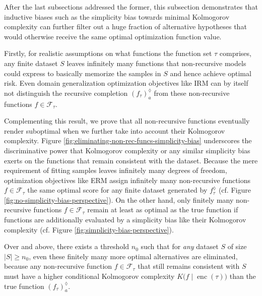 After the last subsections addressed the former, this subsection demonstrates that inductive biases such as the simplicity bias towards minimal Kolmogorov complexity can further filter out a huge fraction of alternative hypotheses that would otherwise receive the same optimal optimization function value.

Firstly, for realistic assumptions on what functions the function set $\tau$ comprises, any finite dataset $S$ leaves infinitely many functions that non-recursive models could express to basically memorize the samples in $S$ and hence achieve optimal risk.
Even domain generalization optimization objectives like IRM can by itself not distinguish the recursive completion $\left(f_{\tau}\right)_a^{\lozenge}$ from these non-recursive functions $f\in \mathcal{F}_{\tau}$.

Complementing this result, we prove that all non-recursive functions eventually render suboptimal when we further take into account their Kolmogorov complexity.
Figure \ref{fig:eliminating-non-rec-funcs-simplicity-bias} underscores the discriminative power that Kolmogorov complexity or any similar simplicity bias exerts on the functions that remain consistent with the dataset.
Because the mere requirement of fitting samples leaves infinitely many degrees of freedom, optimization objectives like ERM assign infinitely many non-recursive functions $f\in\mathcal{F}_{\tau}$ the same optimal score for any finite dataset generated by $f_{\tau}^{\lozenge}$ (cf. Figure \ref{fig:no-simplicity-bias-perspective}).
On the other hand, only finitely many non-recursive functions $f\in\mathcal{F}_{\tau}$ remain at least as optimal as the true function if functions are additionally evaluated by a simplicity bias like their Kolmogorov complexity (cf. Figure \ref{fig:simplicity-bias-perspective}).

Over and above, there exists a threshold $n_0$ such that for \textit{any} dataset $S$ of size $|S|\geq n_0$, even these finitely many more optimal alternatives are eliminated, because any non-recursive function $f\in\mathcal{F}_{\tau}$ that still remains consistent with $S$ must have a higher conditional Kolmogorov complexity $K\bigl(f\mid \operatorname{enc}(\tau)\bigr)$ than the true function $\left(f_{\tau}\right)_a^{\lozenge}$.

